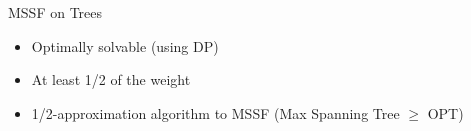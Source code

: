 \begin{frame}{MSSF on Trees}
\begin{itemize}
  \item<1> Optimally solvable (using DP)
  \item<2> At least 1/2 of the weight
  \item<6> 1/2-approximation algorithm to MSSF 
  	{\tiny (Max Spanning Tree $\geq$ OPT)}
\end{itemize}
\centering

\end{frame}